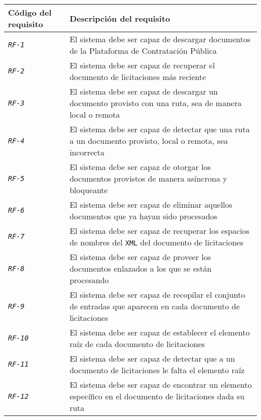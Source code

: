             \begin{longtable}{|| M{3cm} | M{12cm} ||} 
                \hline
                    Código del requisito & Descripción del requisito \\
                \hline\hline
                    \texttt{\textit{RF-1}} & El sistema debe ser capaz de descargar documentos de la Plataforma de Contratación Pública \\ 
                \hline
                    \texttt{\textit{RF-2}} & El sistema debe ser capaz de recuperar el documento de licitaciones más reciente \\
                \hline
                    \texttt{\textit{RF-3}} & El sistema debe ser capaz de descargar un documento provisto con una ruta, sea de manera local o remota \\
                \hline
                    \texttt{\textit{RF-4}} & El sistema debe ser capaz de detectar que una ruta a un documento provisto, local o remota, sea incorrecta \\
                \hline
                    \texttt{\textit{RF-5}} & El sistema debe ser capaz de otorgar los documentos provistos de manera asíncrona y bloqueante \\
                \hline
                    \texttt{\textit{RF-6}} & El sistema debe ser capaz de eliminar aquellos documentos que ya hayan sido procesados \\
                \hline
                    \texttt{\textit{RF-7}} & El sistema debe ser capaz de recuperar los espacios de nombres del \texttt{XML} del documento de licitaciones \\
                \hline
                    \texttt{\textit{RF-8}} & El sistema debe ser capaz de proveer los documentos enlazados a los que se están procesando \\
                \hline
                    \texttt{\textit{RF-9}} & El sistema debe ser capaz de recopilar el conjunto de entradas que aparecen en cada documento de licitaciones \\
                \hline
                    \texttt{\textit{RF-10}} & El sistema debe ser capaz de establecer el elemento raíz de cada documento de licitaciones \\
                \hline
                    \texttt{\textit{RF-11}} & El sistema debe ser capaz de detectar que a un documento de licitaciones le falta el elemento raíz \\
                \hline
                    \texttt{\textit{RF-12}} & El sistema debe ser capaz de encontrar un elemento específico en el documento de licitaciones dada su ruta \\

\end{longtable}
